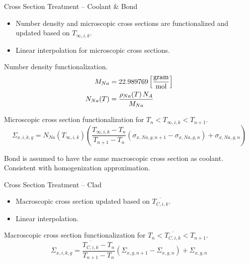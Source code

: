 \begin{frame}{Cross Section Treatment -- Coolant \& Bond}
  \begin{itemize}
    \item Number density and microscopic cross sections are functionalized 
      and updated based on $T_{\infty,i,k}$.
    \item Linear interpolation for microscopic cross sections.
  \end{itemize}

  Number density functionalization.
  \begin{align}
    \label{eq:number_density_sodium}
    M_{Na} &= 22.989769 \left[\text{{$\frac{\text{gram}}{\text{mol}}$}}\right] \\
    N_{Na}(T) &= \frac{\rho_{Na}(T) \, N_A}{M_{Na}}
  \end{align}

  Microscopic cross section functionalization for ${T_{n} < T_{\infty,i,k} <
  T_{n+1}}$.
  \begin{equation}
    \label{eq:xs_cool}
    \Sigma_{x,i,k,g} = N_{Na}(T_{\infty,i,k}) 
      \left( \frac{T_{\infty,i,k} - T_{n}}{T_{n+1}-T_{n}} 
      (\sigma_{x,Na,g,n+1} - \sigma_{x,Na,g,n})  + \sigma_{x,Na,g,n}\right)
  \end{equation}

  Bond is assumed to have the same macroscopic cross section as coolant.\\
  Consistent with homogenization approximation.
\end{frame}

\begin{frame}{Cross Section Treatment -- Clad}
  \begin{itemize}
    \item Macroscopic cross section updated based on $\overline{T_{C,i,k}}$.
    \item Linear interpolation.
  \end{itemize}

  Macroscopic cross section functionalization for ${T_n < \overline{T_{C,i,k}} <
  T_{n+1}}$.
  \begin{equation}
    \label{eq:xs_linear_interpolation}
    \Sigma_{x,i,k,g} = 
      \frac{\overline{T_{C,i,k}} - T_{n}}{T_{n+1}-T_{n}} 
      (\Sigma_{x,g,n+1} - \Sigma_{x,g,n})  + \Sigma_{x,g,n}
  \end{equation}
\end{frame}


